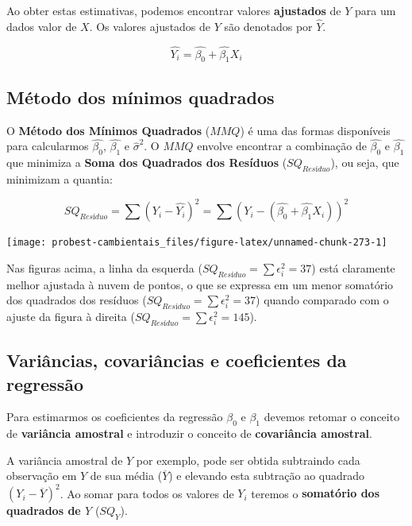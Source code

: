 \documentclass[
]{book}
\begin{document}
Ao obter estas estimativas, podemos encontrar valores \textbf{ajustados} de \(Y\) para um dados valor de \(X\). Os valores ajustados de \(Y\) são denotados por \(\hat{Y}\).

\[\hat{Y_i} = \hat{\beta_0} + \hat{\beta_1}X_i\]

\hypertarget{muxe9todo-dos-muxednimos-quadrados}{%
\subsection{Método dos mínimos quadrados}\label{muxe9todo-dos-muxednimos-quadrados}}

O \textbf{Método dos Mínimos Quadrados} (\(MMQ\)) é uma das formas disponíveis para calcularmos \(\hat{\beta_0}\), \(\hat{\beta_1}\) e \(\hat{\sigma}^2\). O \(MMQ\) envolve encontrar a combinação de \(\hat{\beta_0}\) e \(\hat{\beta_1}\) que minimiza a \textbf{Soma dos Quadrados dos Resíduos} (\(SQ_{Resíduo}\)), ou seja, que minimizam a quantia:

\[SQ_{Resíduo} = \sum{(Y_i-\hat{Y_ i})^2} = \sum{(Y_i-(\hat{\beta_0} + \hat{\beta_1}X_i))^2}\]

\begin{center}\texttt{[image: probest-cambientais\_files/figure-latex/unnamed-chunk-273-1]} \end{center}

Nas figuras acima, a linha da esquerda (\(SQ_{Resíduo} = \sum{\epsilon_i^2} = 37\)) está claramente melhor ajustada à nuvem de pontos, o que se expressa em um menor somatório dos quadrados dos resíduos (\(SQ_{Resíduo} = \sum{\epsilon_i^2} = 37\)) quando comparado com o ajuste da figura à direita (\(SQ_{Resíduo} = \sum{\epsilon_i^2} = 145\)).

\hypertarget{variuxe2ncias-covariuxe2ncias-e-coeficientes-da-regressuxe3o}{%
\subsection{Variâncias, covariâncias e coeficientes da regressão}\label{variuxe2ncias-covariuxe2ncias-e-coeficientes-da-regressuxe3o}}

Para estimarmos os coeficientes da regressão \(\beta_0\) e \(\beta_1\) devemos retomar o conceito de \textbf{variância amostral} e introduzir o conceito de \textbf{covariância amostral}.

A variância amostral de \(Y\) por exemplo, pode ser obtida subtraindo cada observação em \(Y\) de sua média (\(\overline{Y}\)) e elevando esta subtração ao quadrado \((Y_i - \overline{Y})^2\). Ao somar para todos os valores de \(Y_i\) teremos o \textbf{somatório dos quadrados de \(Y\)} (\(SQ_Y\)).
\end{document}
